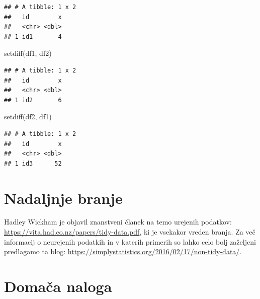 \documentclass[
]{book}
\newenvironment{Shaded}{\begin{snugshade}}{\end{snugshade}}
\newcommand{\FunctionTok}[1]{\textcolor[rgb]{0.00,0.00,0.00}{#1}}
\newcommand{\NormalTok}[1]{#1}
\begin{document}
\begin{verbatim}
## # A tibble: 1 x 2
##   id        x
##   <chr> <dbl>
## 1 id1       4
\end{verbatim}

\begin{Shaded}
\begin{Highlighting}[]
\FunctionTok{setdiff}\NormalTok{(df1, df2)}
\end{Highlighting}
\end{Shaded}

\begin{verbatim}
## # A tibble: 1 x 2
##   id        x
##   <chr> <dbl>
## 1 id2       6
\end{verbatim}

\begin{Shaded}
\begin{Highlighting}[]
\FunctionTok{setdiff}\NormalTok{(df2, df1)}
\end{Highlighting}
\end{Shaded}

\begin{verbatim}
## # A tibble: 1 x 2
##   id        x
##   <chr> <dbl>
## 1 id3      52
\end{verbatim}

\hypertarget{nadaljnje-branje}{%
\section{Nadaljnje branje}\label{nadaljnje-branje}}

Hadley Wickham je objavil znanstveni članek na temo urejenih podatkov: \url{https://vita.had.co.nz/papers/tidy-data.pdf}, ki je vsekakor vreden branja. Za več informacij o neurejenih podatkih in v katerih primerih so lahko celo bolj zaželjeni predlagamo ta blog: \url{https://simplystatistics.org/2016/02/17/non-tidy-data/}.

\hypertarget{domaux10da-naloga-1}{%
\section{Domača naloga}\label{domaux10da-naloga-1}}
\end{document}
